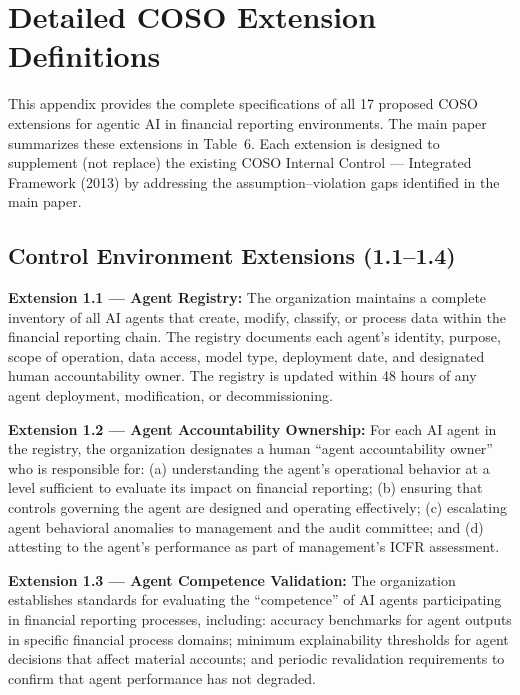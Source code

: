 \documentclass[12pt]{article}
\begin{document}
\newpage

\section{Detailed COSO Extension Definitions}

This appendix provides the complete specifications of all 17 proposed COSO extensions for agentic AI in financial reporting environments. The main paper summarizes these extensions in Table~6. Each extension is designed to supplement (not replace) the existing COSO Internal Control --- Integrated Framework (2013) by addressing the assumption--violation gaps identified in the main paper.

\subsection{Control Environment Extensions (1.1--1.4)}

\begin{definitionbox}
\textbf{Extension 1.1 --- Agent Registry:} The organization maintains a complete inventory of all AI agents that create, modify, classify, or process data within the financial reporting chain. The registry documents each agent's identity, purpose, scope of operation, data access, model type, deployment date, and designated human accountability owner. The registry is updated within 48 hours of any agent deployment, modification, or decommissioning.
\end{definitionbox}

\begin{definitionbox}
\textbf{Extension 1.2 --- Agent Accountability Ownership:} For each AI agent in the registry, the organization designates a human ``agent accountability owner'' who is responsible for: (a) understanding the agent's operational behavior at a level sufficient to evaluate its impact on financial reporting; (b) ensuring that controls governing the agent are designed and operating effectively; (c) escalating agent behavioral anomalies to management and the audit committee; and (d) attesting to the agent's performance as part of management's ICFR assessment.
\end{definitionbox}

\begin{definitionbox}
\textbf{Extension 1.3 --- Agent Competence Validation:} The organization establishes standards for evaluating the ``competence'' of AI agents participating in financial reporting processes, including: accuracy benchmarks for agent outputs in specific financial process domains; minimum explainability thresholds for agent decisions that affect material accounts; and periodic revalidation requirements to confirm that agent performance has not degraded.
\end{definitionbox}
\end{document}
